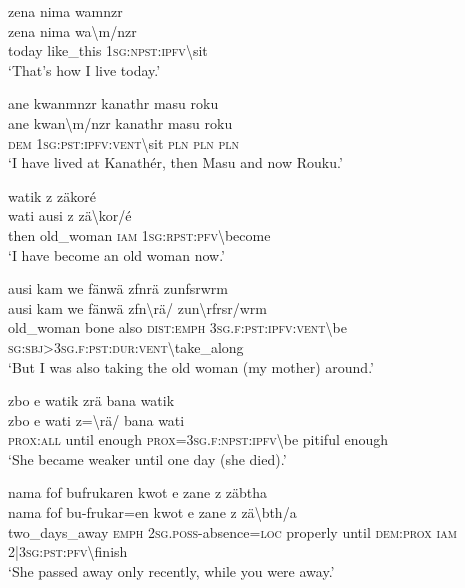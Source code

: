 \ea\label{ex:14:a3225}
zena nima wamnzr\\
\gll zena	nima	wa{\textbackslash}m/nzr\\
     today	like\_this	1\textsc{sg}:\textsc{npst}:\textsc{ipfv}{\textbackslash}sit\\
\glt `That's how I live today.'
\z

\ea\label{ex:14:a3226}
ane kwanmnzr kanathr masu roku\\
\gll ane	kwan{\textbackslash}m/nzr	kanathr	masu	roku\\
     \textsc{dem}	1\textsc{sg}:\textsc{pst}:\textsc{ipfv}:\textsc{vent}{\textbackslash}sit	\textsc{pln}	\textsc{pln}	\textsc{pln}\\
\glt `I have lived at Kanathér, then Masu and now Rouku.'
\z

\ea\label{ex:14:a3230}
watik z zäkoré\\
\gll wati	ausi	z	zä{\textbackslash}kor/é\\
     then	old\_woman	\textsc{iam}	1\textsc{sg}:\textsc{rpst}:\textsc{pfv}{\textbackslash}become\\
\glt `I have become an old woman now.'
\z

\ea\label{ex:14:a3231}
ausi kam we fänwä zfnrä zunfsrwrm\\
\gll ausi	kam	we	fänwä	zfn{\textbackslash}rä/	zun{\textbackslash}rfrsr/wrm\\
     old\_woman	bone	also	\textsc{dist}:\textsc{emph}	3\textsc{sg}.\textsc{f}:\textsc{pst}:\textsc{ipfv}:\textsc{vent}{\textbackslash}be	\textsc{sg}:\textsc{sbj}>3\textsc{sg}.\textsc{f}:\textsc{pst}:\textsc{dur}:\textsc{vent}{\textbackslash}take\_along\\
\glt `But I was also taking the old woman (my mother) around.'
\z

\ea\label{ex:14:a3233}
zbo e watik zrä bana watik\\
\gll zbo	e	wati	z={\textbackslash}rä/	bana	wati\\
     \textsc{prox}:\textsc{all}	until	enough	\textsc{prox}=3\textsc{sg}.\textsc{f}:\textsc{npst}:\textsc{ipfv}{\textbackslash}be	pitiful	enough\\
\glt `She became weaker until one day (she died).'
\z

\ea\label{ex:14:a3235}
nama fof bufrukaren kwot e zane z zäbtha\\
\gll nama	fof	bu-frukar=en	kwot	e	zane	z	zä{\textbackslash}bth/a\\
     two\_days\_away	\textsc{emph}	2\textsc{sg}.\textsc{poss}-absence=\textsc{loc}	properly	until	\textsc{dem}:\textsc{prox}	\textsc{iam}	2|3\textsc{sg}:\textsc{pst}:\textsc{pfv}{\textbackslash}finish\\
\glt `She passed away only recently, while you were away.'
\z

